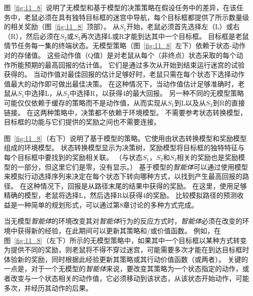 图~\ref{fig:11_8}~说明了无模型和基于模型的决策策略在假设任务中的差异，在该任务中，老鼠必须在具有独特目标框的迷宫中导航，每个目标框都提供了所示数量级的相关奖励（图~\ref{fig:11_8}~顶部）。
从$ S_1 $开始，老鼠必须首先选择左（L）或右（R），然后必须在$ S_2 $或$ S_3 $再次选择L或R才能到达其中一个目标框。
目标框是老鼠情节任务每一集的终端状态。无模型策略（图~\ref{fig:11_8}~左下）依赖于状态-动作对的存储值。
这些动作值（Q值）是对老鼠从每个（非终点）状态采取的每个动作所能预期的最高回报的估计值。
它们是通过多次从开始到结束运行迷宫的试验获得的。
当动作值对最佳回报的估计足够好时，老鼠只需在每个状态下选择动作值最大的动作即可做出最佳决策。
在这种情况下，当动作值估计足够准确时，老鼠从$ S_1 $中选择L，从$ S_2 $中选择R，以获得4的最大回报。
另一种不同的无模型策略可能仅仅依赖于缓存的策略而不是动作值，从而实现从$ S_1 $到L以及从$ S_2 $到R的直接链接。
在这两种策略中，决策都不依赖于环境模型。
不需要参考状态转换模型，目标框的功能与它们提供的奖励之间也不需要连接。


图~\ref{fig:11_8}（右下）说明了基于模型的策略。它使用由状态转换模型和奖励模型组成的环境模型。
状态转换模型显示为决策树，奖励模型将目标框的独特特征与每个目标框中要找到的奖励相关联。
（与状态$ S_1 $，$ S_2 $和$ S_3 $相关的奖励也是奖励模型的一部分，但这里它们是零，没有显示。）
基于模型的\textit{智能体}可以通过使用模型来模拟行动选择序列来决定在每个状态下转向哪种方式，以找到产生最高回报的路径。
在这种情况下，回报是从路径末尾的结果中获得的奖励。
在这里，使用足够精确的模型，老鼠将选择L，然后选择R以获得4的奖励。
比较模拟路径的预测收益是一种简单的规划形式，可以通过第8章讨论的多种方式完成。


当无模型\textit{智能体}的环境改变其对\textit{智能体}行为的反应方式时，\textit{智能体}必须在改变的环境中获得新的经验，在此期间可以更新其策略和/或价值函数。
例如，在图~\ref{fig:11_8}（左下）所示的无模型策略中，如果其中一个目标框以某种方式转变为提供不同的奖励，则老鼠将不得不穿过迷宫，可能需要多次才能在到达目标框时体验新的奖励，同时根据此经验更新其策略或其行动价值函数（或两者）。
关键的一点是，对于一个无模型的\textit{智能体}来说，要改变其策略为一个状态指定的动作，或者改变与一个状态相关的动作值，它必须移动到该状态，从该状态开始动作，可能多次，并经历其动作的后果。


